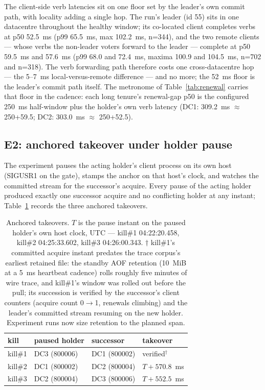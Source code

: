 \documentclass[10pt,journal,letterpaper]{IEEEtran}
\begin{document}
The client-side verb latencies sit on one floor set by the leader's
own commit path, with locality adding a single hop. The run's leader
(id 55) sits in one datacentre throughout the healthy window; its
co-located client completes verbs at p50 52.5~ms (p99 65.5~ms, max
102.2~ms, n=344), and the two remote clients --- whose verbs the
non-leader voters forward to the leader --- complete at p50 59.5~ms
and 57.6~ms (p99 68.0 and 72.4~ms, maxima 100.9 and 104.5~ms, n=702
and n=318). The verb forwarding path therefore costs one
cross-datacentre hop --- the 5--7~ms local-versus-remote difference
--- and no more; the 52~ms floor is the leader's commit path itself.
The metronome of Table~\ref{tab:renewal} carries that floor in the
cadence: each long tenure's renewal-gap p50 is the configured 250~ms
half-window plus the holder's own verb latency (DC1: 309.2~ms
$\approx$ 250+59.5; DC2: 303.0~ms $\approx$ 250+52.5).

\subsection{E2: anchored takeover under holder pause}

The experiment pauses the acting holder's client process on its own
host (SIGUSR1 on the gate), stamps the anchor on that host's clock,
and watches the committed stream for the successor's acquire. Every
pause of the acting holder produced exactly one successor acquire and
no conflicting holder at any instant;
Table~\ref{tab:takeover-elapsed} records the three anchored takeovers.

\begin{table}[t]
\centering
\small
\begin{tabular}{llll}
\toprule
kill & paused holder & successor & takeover \\
\midrule
kill\#1 & DC3 (800006) & DC1 (800002) & verified$^{\dagger}$ \\
kill\#2 & DC1 (800002) & DC2 (800004) & $T+570.8$~ms \\
kill\#3 & DC2 (800004) & DC3 (800006) & $T+552.5$~ms \\
\bottomrule
\end{tabular}
\caption{Anchored takeovers. $T$ is the pause instant on the paused
holder's own host clock, UTC --- kill\#1 04:22:20.458, kill\#2
04:25:33.602, kill\#3 04:26:00.343. $\dagger$ kill\#1's committed
acquire instant predates the
trace corpus's earliest retained file: the standby AOF retention
(10~MiB at a 5~ms heartbeat cadence) rolls roughly five minutes of
wire trace, and kill\#1's window was rolled out before the pull; its
succession is verified by the successor's client counters (acquire
count 0$\to$1, renewals climbing) and the leader's committed stream
resuming on the new holder. Experiment runs now size retention to the
planned span.}
\label{tab:takeover-elapsed}
\end{table}
\end{document}
